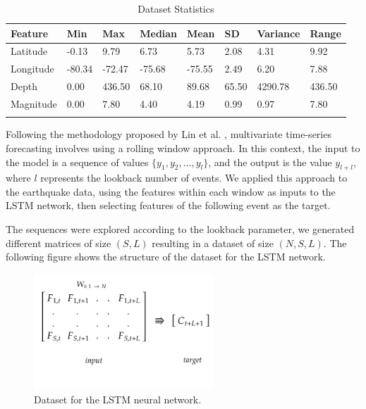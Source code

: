 \documentclass[sn-mathphys-num]{sn-jnl}
\begin{document}
\begin{table}[ht]
    \caption{Dataset Statistics}\label{tab1}
    \begin{tabular}{@{}llllllll@{}}
        \toprule
        Feature   & Min    & Max    & Median & Mean   & SD    & Variance & Range  \\
        \midrule
        Latitude  & -0.13  & 9.79   & 6.73   & 5.73   & 2.08  & 4.31     & 9.92   \\
        Longitude & -80.34 & -72.47 & -75.68 & -75.55 & 2.49  & 6.20     & 7.88   \\
        Depth     & 0.00   & 436.50 & 68.10  & 89.68  & 65.50 & 4290.78  & 436.50 \\
        Magnitude & 0.00   & 7.80   & 4.40   & 4.19   & 0.99  & 0.97     & 7.80   \\
        \botrule
    \end{tabular}
\end{table}
\unskip

Following the methodology proposed by Lin et al. \cite{lai_modeling_2018}, multivariate time-series forecasting involves using a rolling window approach. In this context, the input to the model is a sequence of values \( \{y_1, y_2, \ldots, y_l\} \), and the output is the value \( y_{l+l} \), where \( l \) represents the lookback number of events. We applied this approach to the earthquake data, using the features within each window as inputs to the LSTM network, then selecting features of the following event as the target.

The sequences were explored according to the lookback parameter, we generated different matrices of size \( (S, L) \) resulting in a dataset of size \( (N, S, L)\). The following figure shows the structure of the dataset for the LSTM network.

\begin{figure}[H]
    \begin{center}
        \includegraphics[width=0.6\textwidth]{img/dataset-diagram.png}
        \caption{Dataset for the LSTM neural network.\label{fig3}}
    \end{center}
\end{figure}
\end{document}
